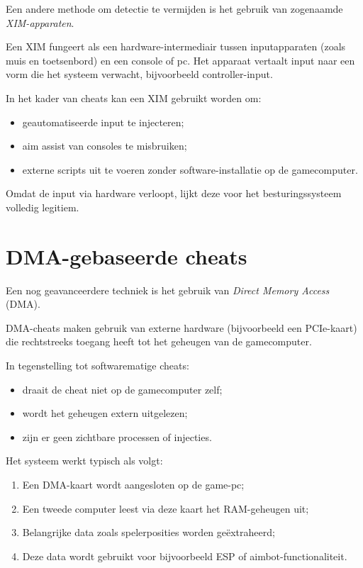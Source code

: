 Een andere methode om detectie te vermijden is het gebruik van zogenaamde \textit{XIM-apparaten}.

Een XIM fungeert als een hardware-intermediair tussen inputapparaten (zoals muis en toetsenbord) en een console of pc. Het apparaat vertaalt input naar een vorm die het systeem verwacht, bijvoorbeeld controller-input.

In het kader van cheats kan een XIM gebruikt worden om:
\begin{itemize}
    \item geautomatiseerde input te injecteren;
    \item aim assist van consoles te misbruiken;
    \item externe scripts uit te voeren zonder software-installatie op de gamecomputer.
\end{itemize}

Omdat de input via hardware verloopt, lijkt deze voor het besturingssysteem volledig legitiem.

\section{DMA-gebaseerde cheats}

Een nog geavanceerdere techniek is het gebruik van \textit{Direct Memory Access} (DMA).

DMA-cheats maken gebruik van externe hardware (bijvoorbeeld een PCIe-kaart) die rechtstreeks toegang heeft tot het geheugen van de gamecomputer.

In tegenstelling tot softwarematige cheats:
\begin{itemize}
    \item draait de cheat niet op de gamecomputer zelf;
    \item wordt het geheugen extern uitgelezen;
    \item zijn er geen zichtbare processen of injecties.
\end{itemize}

Het systeem werkt typisch als volgt:
\begin{enumerate}
    \item Een DMA-kaart wordt aangesloten op de game-pc;
    \item Een tweede computer leest via deze kaart het RAM-geheugen uit;
    \item Belangrijke data zoals spelerposities worden geëxtraheerd;
    \item Deze data wordt gebruikt voor bijvoorbeeld ESP of aimbot-functionaliteit.
\end{enumerate}

